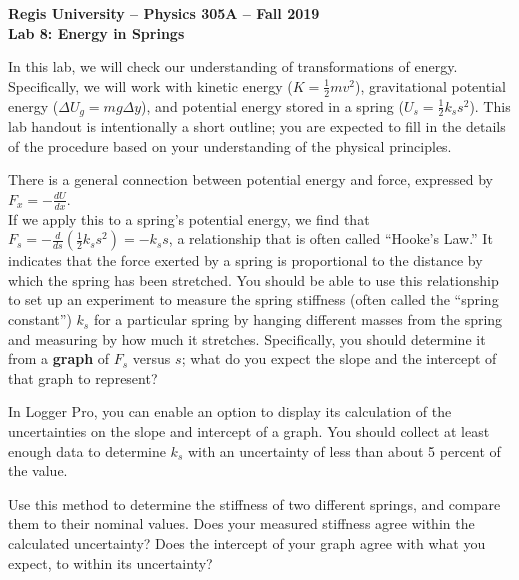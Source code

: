 \documentclass[12pt]{article}
\begin{document}
\begin{center}
{\bf{Regis University -- Physics 305A -- Fall 2019}} \\
{\bf{Lab 8: Energy in Springs}} \\
\medskip
\end{center}

\medskip

In this lab, we will check our understanding of transformations of 
energy. Specifically, we will work with kinetic 
energy ($K = \frac{1}{2} m v^2$), gravitational potential 
energy ($\Delta U_g = m g \Delta y$), and potential energy stored in a 
spring ($U_s = \frac{1}{2} k_s s^2$).  This lab handout is 
intentionally a short outline; you are expected to fill in the 
details of the procedure based on your understanding of the physical
principles. 
\bigskip


\medskip

There is a general connection between potential energy and force,
expressed by $F_x = - \frac{d U} {d x}$.  \\
If we apply this to a spring's potential energy, we find that 
$F_s = - \frac{d}{d s} (\frac{1}{2} k_s s^2) = - k_s s$, a relationship
that is often called ``Hooke's Law.''  It indicates that the force
exerted by a spring is proportional to the distance by which the spring
has been stretched.
You should be able to use this relationship to set up an experiment 
to measure the spring stiffness (often called the ``spring constant'') 
$k_s$ for a particular spring by 
hanging different masses from the spring and measuring by how much it
stretches.  Specifically, you should determine it from a {\bf graph} of 
$F_s$ versus $s$; what do you expect the slope and the intercept of 
that graph to represent?

In Logger Pro, you can enable an option to display its calculation of 
the uncertainties on the slope and intercept of a graph.  You should collect at 
least enough data to determine $k_s$ with an uncertainty of less than about
5 percent of the value.

Use this method to determine the stiffness of two different springs, 
and compare them to their nominal values.  Does your measured stiffness
agree within the calculated uncertainty?  Does the intercept of your graph 
agree with what you expect, to within its uncertainty?

\bigskip

\medskip
\end{document}
